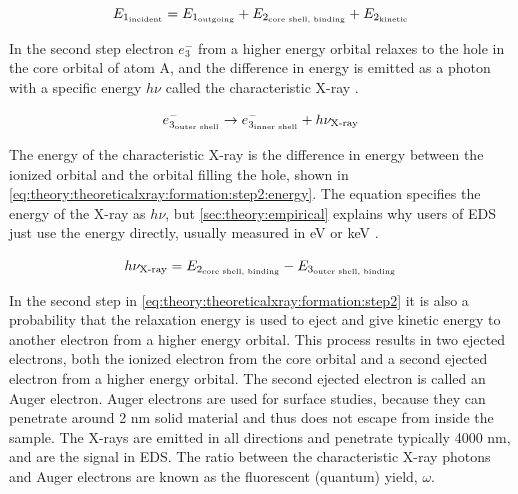 \begin{equation}
    \label{eq:theory:theoreticalxray:formation:step1:energy}
    E_{1_{\textnormal{incident}}} = E_{1_{\textnormal{outgoing}}} + E_{2_{\textnormal{core shell, binding}}} + E_{2_{\textnormal{kinetic}}}
\end{equation}

In the second step electron $e^-_{3}$ from a higher energy orbital relaxes to the hole in the core orbital of atom A, and the difference in energy is emitted as a photon with a specific energy $h\nu$ called the characteristic X-ray \cite[Eq. (8.12)]{hollas_modern_2004}.

\begin{equation}
    \label{eq:theory:theoreticalxray:formation:step2}
    e^-_{3_{\textnormal{outer shell}}} \rightarrow e^-_{3_{\textnormal{inner shell}}} + h\nu_{\textnormal{X-ray}}
\end{equation}

The energy of the characteristic X-ray is the difference in energy between the ionized orbital and the orbital filling the hole, shown in \cref{eq:theory:theoreticalxray:formation:step2:energy}.
The equation specifies the energy of the X-ray as $h\nu$, but \cref{sec:theory:empirical} explains why users of EDS just use the energy directly, usually measured in eV or keV \cite[Eq. (4.2b)]{goldstein_scanning_2018}.

\begin{equation}
    \label{eq:theory:theoreticalxray:formation:step2:energy}
    h\nu_{\textnormal{X-ray}} = E_{2_{\textnormal{core shell, binding}}} - E_{3_{\textnormal{outer shell, binding}}}
\end{equation}


In the second step in \cref{eq:theory:theoreticalxray:formation:step2} it is also a probability that the relaxation energy is used to eject and give kinetic energy to another electron from a higher energy orbital.
This process results in two ejected electrons, both the ionized electron from the core orbital and a second ejected electron from a higher energy orbital.
The second ejected electron is called an Auger electron.
Auger electrons are used for surface studies, because they can penetrate around 2 nm solid material and thus does not escape from inside the sample.
The X-rays are emitted in all directions and penetrate typically 4000 nm, and are the signal in EDS.
The ratio between the characteristic X-ray photons and Auger electrons are known as the fluorescent (quantum) yield, $\omega$. %

